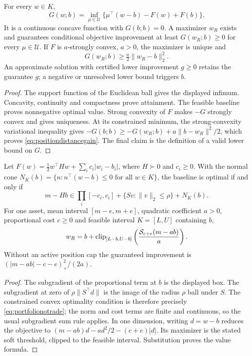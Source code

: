 \begin{theorem}
\label{thm:robustpositiongain}
For every $w\in K$,
\[
 G(w;b)=\inf_{\mu\in\mathcal U}
 \{\mu^\top(w-b)-F(w)+F(b)\}.
\]
It is a continuous concave function with $G(b;b)=0$. A maximizer $w_R$
exists and guarantees conditional objective improvement at least
$G(w_R;b)\ge0$ for every $\mu\in\mathcal U$. If $F$ is $a$-strongly
convex, $a>0$, the maximizer is unique and
\begin{equation}\label{eq:positiondistancegain}
 G(w_R;b)\ge\tfrac a2\|w_R-b\|_2^2.
\end{equation}
An approximate solution with certified lower improvement $g\ge0$ retains
the guarantee $g$; a negative or unresolved lower bound triggers $b$.
\end{theorem}
\begin{proof}
The support function of the Euclidean ball gives the displayed infimum.
Concavity, continuity and compactness prove attainment. The feasible
baseline proves nonnegative optimal value. Strong convexity of $F$ makes
$-G$ strongly convex and gives uniqueness. At its constrained minimum,
the strong-convexity variational inequality gives
$-G(b;b)\ge-G(w_R;b)+a\|b-w_R\|^2/2$, which proves
\eqref{eq:positiondistancegain}. The final claim is the definition of a
valid lower bound on $G$.
\end{proof}

\begin{proposition}
\label{prop:portfolionotrade}
Let
$F(w)=\tfrac12w^\top Hw+\sum_i c_i|w_i-b_i|$, where $H\succ0$ and
$c_i\ge0$. With the normal cone
$N_K(b)=\{n:n^\top(w-b)\le0\text{ for all }w\in K\}$,
the baseline is optimal if and only if
\begin{equation}\label{eq:portfolionotrade}
 m-Hb\in
 \prod_i[-c_i,c_i]+\{Sv:\|v\|_2\le\rho\}+N_K(b).
\end{equation}
For one asset, mean interval $[m-e,m+e]$, quadratic coefficient $a>0$,
proportional cost $c\ge0$ and feasible interval $K=[L,U]$ containing $b$,
\begin{equation}\label{eq:robustsoft}
 w_R=b+\operatorname{clip}_{[L-b,U-b]}
       \left(\frac{\mathcal S_{c+e}(m-ab)}{a}\right).
\end{equation}
Without an active position cap the guaranteed improvement is
$(|m-ab|-c-e)_+^2/(2a)$.
\end{proposition}
\begin{proof}
The subgradient of the proportional term at $b$ is the displayed box.
The subgradient at zero of $\rho\|S^\top d\|$ is the image of the radius
$\rho$ ball under $S$. The constrained convex optimality condition is
therefore precisely \eqref{eq:portfolionotrade}; the norm and cost terms
are finite and continuous, so the usual subgradient sum rule applies.
In one dimension, writing $d=w-b$ reduces the objective to
$(m-ab)d-a d^2/2-(c+e)|d|$. Its maximizer is the stated soft threshold,
clipped to the feasible interval. Substitution proves the value formula.
\end{proof}

